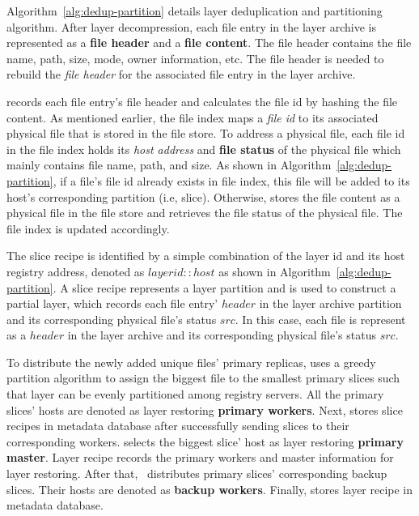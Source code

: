 


Algorithm~\ref{alg:dedup-partition} details layer deduplication and partitioning algorithm.
After layer decompression, 
each file entry in the layer archive is represented as a \textbf{file header} and a \textbf{file content}.
The file header contains the file name, path, size, mode, owner information, etc.
The file header is needed to rebuild the \emph{file header} for 
the associated file entry in the layer archive.

\sysname records each file entry's file header and 
calculates the file id by hashing the file content.
As mentioned earlier, the file index maps a \emph{file id} to its associated physical file that is stored in the file store.
To address a physical file,
each file id in the file index holds its 
\emph{host address} and \textbf{file status} of the physical file which mainly contains file name, path, and size.
As shown in Algorithm~\ref{alg:dedup-partition}, 
if a file's file id already exists in file index, 
this file will be added to its host's corresponding partition (i.e, slice). 
Otherwise,
\sysname stores the file content as a physical file in the file store
and retrieves the file status of the physical file.
The file index is updated accordingly.

The slice recipe is identified by a simple combination of the layer id and its host registry address,
denoted as $layerid::host$ as shown in Algorithm~\ref{alg:dedup-partition}.
A slice recipe represents a layer partition and
is used to construct a partial layer,
which
records each file entry' $header$ in the layer archive partition and 
its corresponding physical file's status $src$. 
In this case, 
each file is represent as a $header$ in the layer archive and
its corresponding physical file's status $src$. 




To distribute the newly added unique files' primary replicas,
\sysname uses a greedy partition algorithm to 
assign the biggest file to the smallest primary slices
such that layer can be evenly partitioned among registry servers.
All the primary slices' hosts are denoted as layer restoring \textbf{primary workers}. 
Next, \sysname stores slice recipes in metadata database after successfully
sending slices to their corresponding workers.
\sysname selects the biggest slice' host as layer restoring \textbf{primary master}.
Layer recipe records the primary workers and master information for layer restoring.
After that, \sysname~distributes primary slices' corresponding backup slices.
Their hosts are denoted as \textbf{backup workers}.
Finally, \sysname stores layer recipe in metadata database.

